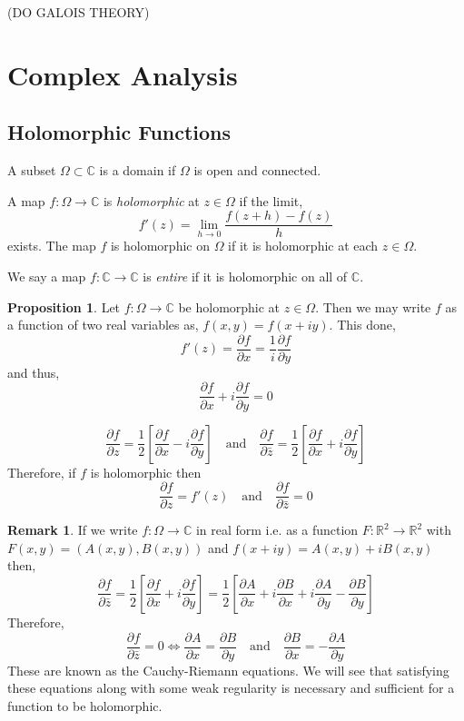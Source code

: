 \documentclass{article}
\newcommand{\R}{\mathbb{R}}
\newcommand{\C}{\mathbb{C}}
\newcommand{\pderiv}[2]{\frac{\partial{#1}}{\partial{#2}}}
\theoremstyle{definition}
\newtheorem{proposition}[theorem]{Proposition}
\newtheorem{remark}{Remark}[section]
\newenvironment{definition}[1][Definition:]{\begin{trivlist}
\item[\hskip \labelsep {\bfseries #1}]}{\end{trivlist}}
\begin{document}
(DO GALOIS THEORY)

\section{Complex Analysis}

\subsection{Holomorphic Functions}

\begin{definition}
A subset $\Omega \subset \C$ is a domain if $\Omega$ is open and connected.
\end{definition}

\begin{definition}
A map $f : \Omega \to \C$ is \textit{holomorphic} at $z \in \Omega$ if the limit,
\[ f'(z) = \lim_{h \to 0} \frac{ f(z + h) - f(z) }{h} \]
exists. The map $f$ is holomorphic on $\Omega$ if it is holomorphic at each $z \in \Omega$. 
\end{definition}

\begin{definition}
We say a map $f : \C \to \C$ is \textit{entire} if it is holomorphic on all of $\C$.
\end{definition}

\begin{proposition}
Let $f : \Omega \to \C$ be holomorphic at $z \in \Omega$. Then we may write $f$ as a function of two real variables as, $f(x, y) = f(x + i y)$. This done,
\[ f'(z) = \pderiv{f}{x} = \frac{1}{i} \pderiv{f}{y} \]
and thus,
\[ \pderiv{f}{x} + i \pderiv{f}{y} = 0 \] 
\end{proposition}


\begin{definition}
\[ \pderiv{f}{z} = \frac{1}{2} \left[ \pderiv{f}{x} - i \pderiv{f}{y} \right] \quad \text{and} \quad \pderiv{f}{\bar{z}} = \frac{1}{2} \left[ \pderiv{f}{x} + i \pderiv{f}{y} \right] \]
Therefore, if $f$ is holomorphic then 
\[ \pderiv{f}{z} = f'(z) \quad \text{and} \quad \pderiv{f}{\bar{z}} = 0 \]
\end{definition}


\begin{remark}
If we write $f : \Omega \to \C$ in real form i.e. as a function $F : \R^2 \to \R^2$ with $F(x,y) = (A(x,y), B(x,y))$ and $f(x + iy) = A(x,y) + i B(x,y)$ then,
\[ \pderiv{f}{\bar{z}} = \frac{1}{2} \left[ \pderiv{f}{x} + i \pderiv{f}{y} \right] = \frac{1}{2} \left[ \pderiv{A}{x} + i \pderiv{B}{x} + i \pderiv{A}{y} - \pderiv{B}{y} \right] \]
Therefore,
\[ \pderiv{f}{\bar{z}} = 0 \iff \pderiv{A}{x} = \pderiv{B}{y} \quad \text{and} \quad \pderiv{B}{x} = - \pderiv{A}{y} \]
These are known as the Cauchy-Riemann equations. We will see that satisfying these equations along with some weak regularity is necessary and sufficient for a function to be holomorphic. 
\end{remark}
\end{document}

